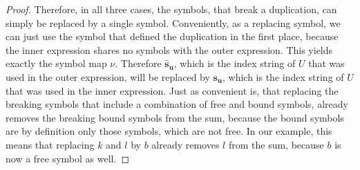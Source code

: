 \begin{proof}
    Therefore, in all three cases, the symbols, that break a duplication, can simply be replaced by a single symbol.
    Conveniently, as a replacing symbol, we can just use the symbol that defined the duplication in the first place,
    because the inner expression shares no symbols with the outer expression.
    This yields exactly the symbol map $\nu$.
    Therefore $\bm{\hat{s}_u}$, which is the index string of $U$ that was used in the outer expression, will be replaced by $\bm{s_u}$, which is the index string of $U$ that was used in the inner expression.
    Just as convenient is, that replacing the breaking symbols that include a combination of free and bound symbols, already removes the breaking bound symbols from the sum,
    because the bound symbols are by definition only those symbols, which are not free.
    In our example, this means that replacing $k$ and $l$ by $b$ already removes $l$ from the sum, because $b$ is now a free symbol as well.


\end{proof}
